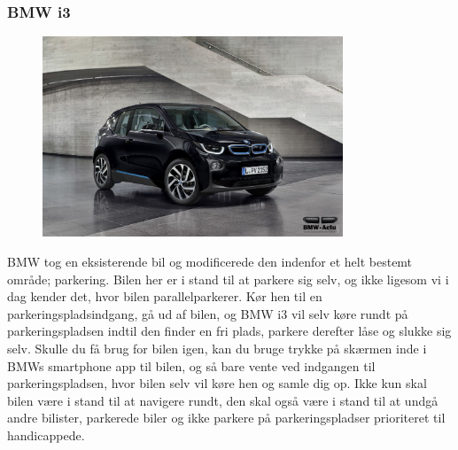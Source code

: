 \subsubsection{BMW i3}
\begin{figure}[h!]
	\centering
	\includegraphics[width=0.8\textwidth]{images/bmw-i3-fluid-black-1.jpg}
	\label{fig:BMW_i3}
\end{figure}
BMW tog en eksisterende bil og modificerede den indenfor et helt bestemt område; parkering. Bilen her er i stand til at parkere sig selv, og ikke ligesom vi i dag kender det, hvor bilen parallelparkerer. Kør hen til en parkeringspladsindgang, gå ud af bilen, og BMW i3 vil selv køre rundt på parkeringspladsen indtil den finder en fri plads, parkere derefter låse og slukke sig selv. Skulle du få brug for bilen igen, kan du bruge trykke på skærmen inde i BMWs smartphone app til bilen, og så bare vente ved indgangen til parkeringspladsen, hvor bilen selv vil køre hen og samle dig op. Ikke kun skal bilen være i stand til at navigere rundt, den skal også være i stand til at undgå andre bilister, parkerede biler og ikke parkere på parkeringspladser prioriteret til handicappede.